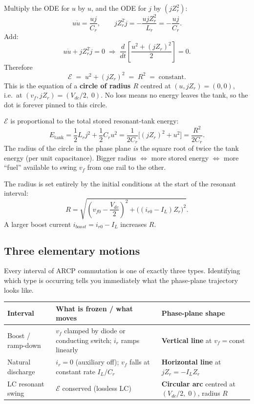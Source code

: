 \documentclass[12pt, a4paper]{article}
\def\,{ }%
\newcommand{\Vdc}{V_{dc}}
\newcommand{\ir}{i_r}
\newcommand{\IL}{I_L}
\begin{document}
\begin{physbox}
Multiply the ODE for $u$ by $u$, and the ODE for $j$ by $(j Z_r^2)$:
\[
    u\dot{u} = \frac{uj}{C_r},
    \qquad
    j Z_r^2\,\dot{j} = -\frac{u\,j\,Z_r^2}{L_r} = -\frac{uj}{C_r}.
\]
Add:
\[
    u\dot{u} + j Z_r^2\,\dot{j} = 0
    \;\Longrightarrow\;
    \frac{d}{dt}\!\left[\frac{u^2 + (jZ_r)^2}{2}\right] = 0.
\]
Therefore
\[
    \boxed{\mathcal{E} \;=\; u^2 + (j Z_r)^2 \;=\; R^2 \;=\; \text{constant}.}
\]
This is the equation of a \textbf{circle of radius $R$} centred at
$(u, jZ_r) = (0,0)$, i.e.\ at $(v_f, jZ_r) = (\Vdc/2,\; 0)$.
No loss means no energy leaves the tank, so the dot is forever
pinned to this circle.
\end{physbox}

\noindent
$\mathcal{E}$ is proportional to the total stored resonant-tank energy:
\[
    E_\text{tank}
    = \frac{1}{2}L_r j^2 + \frac{1}{2}C_r u^2
    = \frac{1}{2C_r}\bigl[(jZ_r)^2 + u^2\bigr]
    = \frac{R^2}{2C_r}.
\]
The radius of the circle in the phase plane \emph{is} the square root of
twice the tank energy (per unit capacitance).
Bigger radius $\Leftrightarrow$ more stored energy $\Leftrightarrow$
more ``fuel'' available to swing $v_f$ from one rail to the other.

The radius is set entirely by the initial conditions at the start of the
resonant interval:
\[
    R = \sqrt{\!\left(v_{f0} - \frac{\Vdc}{2}\right)^{\!2}
              + \bigl((i_{r0}-\IL)\,Z_r\bigr)^2}.
\]
A larger boost current $i_{boost} = i_{r0} - \IL$ increases $R$.

\subsection{Three elementary motions}
\label{ssec:pp_three_motions}

Every interval of ARCP commutation is one of exactly three types.
Identifying which type is occurring tells you immediately what the
phase-plane trajectory looks like.

\begin{center}
\renewcommand{\arraystretch}{1.6}
\begin{tabular}{p{3.1cm} p{4.8cm} p{4.8cm}}
\toprule
\textbf{Interval} & \textbf{What is frozen / what moves}
                  & \textbf{Phase-plane shape} \\
\midrule
Boost / ramp-down
    & $v_f$ clamped by diode or conducting switch; $\ir$ ramps linearly
    & \textbf{Vertical line} at $v_f = \text{const}$ \\
Natural discharge
    & $\ir = 0$ (auxiliary off); $v_f$ falls at constant rate $\IL/C_r$
    & \textbf{Horizontal line} at $jZ_r = -\IL Z_r$ \\
LC resonant swing
    & $\mathcal{E}$ conserved (lossless LC)
    & \textbf{Circular arc} centred at $(\Vdc/2,\; 0)$, radius $R$ \\
\bottomrule
\end{tabular}
\end{center}
\end{document}
